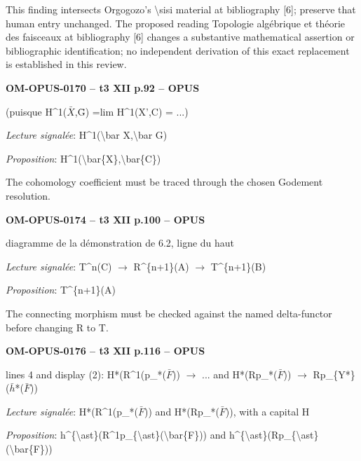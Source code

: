 This finding intersects Orgogozo's \textbackslash{}sisi material at bibliography [6]; preserve that human entry unchanged. The proposed reading Topologie algébrique et théorie des faisceaux at bibliography [6] changes a substantive mathematical assertion or bibliographic identification; no independent derivation of this exact replacement is established in this review.\par
\par\noindent\textbf{OM-OPUS-0170 -- t3 XII p.92 -- OPUS}\par
(puisque H\textasciicircum{}1(\ensuremath{\bar{X}},Ḡ) =\allowbreak  lim H\textasciicircum{}1(X',C) = ...)\par
\emph{Lecture signalée}: H\textasciicircum{}1(\textbackslash{}bar X,\textbackslash{}bar G)\par
\emph{Proposition}: H\textasciicircum{}1(\textbackslash{}bar\{X\},\textbackslash{}bar\{C\})\par
The cohomology coefficient must be traced through the chosen Godement resolution.\par
\par\noindent\textbf{OM-OPUS-0174 -- t3 XII p.100 -- OPUS}\par
diagramme de la démonstration de 6.2, ligne du haut\par
\emph{Lecture signalée}: T\textasciicircum{}n(C) \ensuremath{\to} R\textasciicircum{}\{n+1\}(A) \ensuremath{\to} T\textasciicircum{}\{n+1\}(B)\par
\emph{Proposition}: T\textasciicircum{}\{n+1\}(A)\par
The connecting morphism must be checked against the named delta-functor before changing R to T.\par
\par\noindent\textbf{OM-OPUS-0176 -- t3 XII p.116 -- OPUS}\par
lines 4 and display (2): H*(R\textasciicircum{}1(p\_*(\ensuremath{\bar{F}})) \ensuremath{\to} ... and H*(Rp\_*(\ensuremath{\bar{F}})) \ensuremath{\to} Rp\_\{Y*\}(\ensuremath{\bar{h}}*(\ensuremath{\bar{F}}))\par
\emph{Lecture signalée}: H*(R\textasciicircum{}1(p\_*(\ensuremath{\bar{F}})) and H*(Rp\_*(\ensuremath{\bar{F}})), with a capital H\par
\emph{Proposition}: h\textasciicircum{}\{\textbackslash{}ast\}(R\textasciicircum{}1p\_\{\textbackslash{}ast\}(\textbackslash{}bar\{F\})) and h\textasciicircum{}\{\textbackslash{}ast\}(Rp\_\{\textbackslash{}ast\}(\textbackslash{}bar\{F\}))\par
